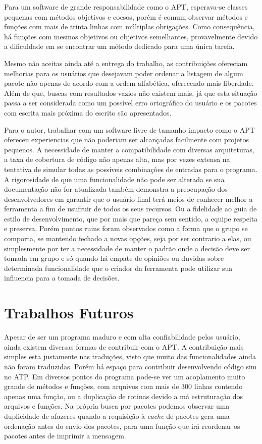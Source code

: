 Para um software de grande responsabilidade como o APT, esperava-se classes pequenas com métodos objetivos e coesos, porém é comum observar métodos e funções com mais de trinta linhas com múltiplas obrigações. Como consequência, há funções com mesmos objetivos ou objetivos semelhantes, provavelmente devido a dificuldade em se encontrar um método dedicado para uma única tarefa.

Mesmo não aceitas ainda até a entrega do trabalho, as contribuições ofereciam melhorias para os usuários que desejavam poder ordenar a listagem de algum pacote não apenas de acordo com a ordem alfabética, oferecendo mais liberdade. Além de que, buscas com resultados vazios não existem mais, já que esta situação passa a ser considerada como um possível erro ortográfico do usuário e os pacotes com escrita mais próxima do escrito são apresentados.

Para o autor, trabalhar com um software livre de tamanho impacto como o {\code APT} ofereceu experiencias que não poderiam ser alcançadas facilmente com projetos pequenos. A necessidade de manter a compatibilidade com diversas arquiteturas, a taxa de cobertura de código não apenas alta, mas por vezes extensa na tentativa de simular todas as possíveis combinações de entradas para o programa. A rigorosidade de que uma funcionalidade não pode ser alterada se sua documentação não for atualizada também demonstra a preocupação dos desenvolvedores em garantir que o usuário final terá meios de conhecer melhor a ferramenta a fim de usufruir de todos os seus recursos. Ou a fidelidade ao guia de estilo de desenvolvimento, que por mais que pareça sem sentido, a equipe respeita e preserva. Porém pontos ruins foram observados como a forma que o grupo se comporta, se mantendo fechado a novas opções, seja por ser contrario a elas, ou simplesmente por ter a necessidade de manter o padrão onde a decisão deve ser tomada em grupo e só quando há empate de opiniões ou duvidas sobre determinada funcionalidade que o criador da ferramenta pode utilizar sua influencia para a tomada de decisões.

\section*{Trabalhos Futuros} %
\label{sec:trabalhos_futuros}

Apesar de ser um programa maduro e com alta confiabilidade pelos usuário, ainda existem diversas formas de contribuir com o {\code APT}. A contribuição mais simples esta justamente nas traduções, visto que muito das funcionalidades ainda não foram traduzidas. Porém há espaço para contribuir desenvolvendo código sim no {\code ATP}. Em diversos pontos do programa pode-se ver um acoplamento muito grande de métodos e funções, com arquivos com mais de 300 linhas contendo apenas uma função, ou a duplicação de rotinas devido a má estruturação dos arquivos e funções. Na própria busca por pacotes podemos observar uma duplicidade de afazeres quando a requisição à \textit{cache} de pacotes gera uma ordenação antes do envio dos pacotes, para uma função que irá reordenar os pacotes antes de imprimir a mensagem.


